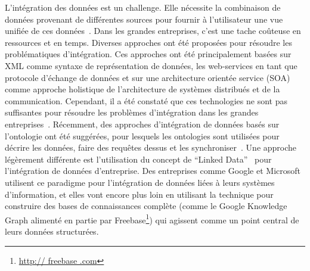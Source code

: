 L'int\'{e}gration des donn\'{e}es est un challenge. Elle n\'{e}cessite la combinaison de donn\'{e}es provenant de diff\'{e}rentes sources pour fournir \`{a} l'utilisateur une vue unifi\'{e}e de ces donn\'{e}es~\cite{Lenzerini:SIGMOD:02}. Dans les grandes entreprises, c'est une tache coûteuse en ressources et en temps. Diverses approches ont \'{e}t\'{e} propos\'{e}es pour r\'{e}soudre les probl\'{e}matiques d'int\'{e}gration. Ces approches ont \'{e}t\'{e} principalement bas\'{e}es sur XML comme syntaxe de repr\'{e}sentation de donn\'{e}es, les web-services en tant que protocole d'\'{e}change de donn\'{e}es et sur une architecture orient\'{e}e service (SOA) comme approche holistique de l'architecture de syst\`{e}mes distribu\'{e}s et de la communication. Cependant, il a \'{e}t\'{e} constat\'{e} que ces technologies ne sont pas suffisantes pour r\'{e}soudre les probl\`{e}mes d'int\'{e}gration dans les grandes entreprises~\cite{Frischmuth:ISWC:13,Frischmuth:SemWebJorunal:12}. R\'{e}cemment, des approches d'int\'{e}gration de donn\'{e}es bas\'{e}s sur l'ontologie ont \'{e}t\'{e} sugg\'{e}r\'{e}es, pour lesquels les ontologies sont utilis\'{e}es pour d\'{e}crire les donn\'{e}es, faire des requ\^{e}tes dessus et les synchroniser~\cite{Wache:IJCAI:01}. Une approche l\'{e}g\`{e}rement diff\'{e}rente est l'utilisation du concept de ``Linked Data''~\cite{Bizer:IJSWIS:09} pour l'int\'{e}gration de donn\'{e}es d'entreprise. Des entreprises comme Google et Microsoft utilisent ce paradigme pour l'int\'{e}gration de donn\'{e}es li\'{e}es \`{a} leurs syst\`{e}mes d'information, et elles vont encore plus loin en utilisant la technique pour construire des bases de connaissances compl\`{e}te (comme le Google Knowledge Graph aliment\'{e} en partie par Freebase\footnote{\url{http:// freebase .com}}) qui agissent comme un point central de leurs donn\'{e}es structur\'{e}es.

